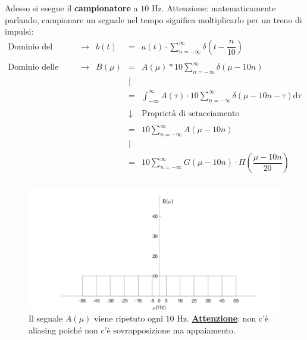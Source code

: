 \documentclass[a4paper]{article}
\begin{document}
	\noindent
	Adesso si esegue il \textbf{campionatore} a $10$ Hz. Attenzione: matematicamente parlando, campionare un segnale nel tempo significa moltiplicarlo per un treno di impulsi:
	\begin{equation*}
		\begin{array}{lllcl}
			\text{Dominio del tempo } & \longrightarrow & b\left(t\right) & = & a\left(t\right) \cdot \displaystyle\sum_{n = -\infty}^{\infty} \delta\left(t - \dfrac{n}{10}\right) \\
			&&&& \\
			\text{Dominio delle frequenze } & \longrightarrow & B\left(\mu\right) & = & A\left(\mu\right) * 10 \displaystyle\sum_{n = -\infty}^{\infty} \delta\left(\mu - 10n\right) \\
			&&& | & \\
			&&&=& \displaystyle\int_{-\infty}^{\infty} A\left(\tau\right) \cdot 10\displaystyle\sum_{n=-\infty}^{\infty} \delta\left(\mu - 10n - \tau\right) \mathrm{d}\tau \\
			&&&& \\
			&&& \downarrow & \text{Proprietà di setacciamento} \\
			&&&& \\
			&&&=& 10\displaystyle\sum_{n=-\infty}^{\infty} A\left(\mu - 10n\right) \\
			&&& | & \\
			&&&=& 10\displaystyle\sum_{n=-\infty}^{\infty} G\left(\mu - 10n\right) \cdot \Pi\left(\dfrac{\mu - 10n}{20}\right) \\
		\end{array}
	\end{equation*}
	\begin{figure}[!htp]
		\centering
		\includegraphics[width=\textwidth]{img/segnale_A-campionatore.PNG}
		\caption*{Il segnale $A\left(\mu\right)$ viene ripetuto ogni $10$ Hz.\newline
			\textbf{\underline{Attenzione}}: non c'è aliasing poiché non c'è sovrapposizione ma appaiamento.}
	\end{figure}\newpage
	
\end{document}
